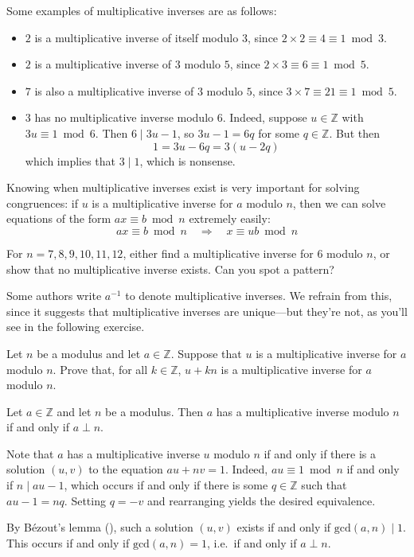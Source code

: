 \begin{example}
Some examples of multiplicative inverses are as follows:
\begin{itemize}
\item $2$ is a multiplicative inverse of itself modulo $3$, since $2 \times 2 \equiv 4 \equiv 1 \bmod 3$.
\item $2$ is a multiplicative inverse of $3$ modulo $5$, since $2 \times 3 \equiv 6 \equiv 1 \bmod 5$.
\item $7$ is also a multiplicative inverse of $3$ modulo $5$, since $3 \times 7 \equiv 21 \equiv 1 \bmod 5$.
\item $3$ has no multiplicative inverse modulo $6$. Indeed, suppose $u \in \mathbb{Z}$ with $3u \equiv 1 \bmod 6$. Then $6 \mid 3u-1$, so $3u-1 = 6q$ for some $q \in \mathbb{Z}$. But then
\[ 1 = 3u-6q = 3(u-2q) \]
which implies that $3 \mid 1$, which is nonsense.
\end{itemize}
\end{example}

Knowing when multiplicative inverses exist is very important for solving congruences: if $u$ is a multiplicative inverse for $a$ modulo $n$, then we can solve equations of the form $ax \equiv b \bmod n$ extremely easily:
\[ ax \equiv b \bmod n \quad \Rightarrow \quad x \equiv ub \bmod n \]

\begin{exercise}
For $n=7,8,9,10,11,12$, either find a multiplicative inverse for $6$ modulo $n$, or show that no multiplicative inverse exists. Can you spot a pattern?
\end{exercise}

Some authors write $a^{-1}$ to denote multiplicative inverses. We refrain from this, since it suggests that multiplicative inverses are unique---but they're not, as you'll see in the following exercise.

\begin{exercise}
Let $n$ be a modulus and let $a \in \mathbb{Z}$. Suppose that $u$ is a multiplicative inverse for $a$ modulo $n$. Prove that, for all $k \in \mathbb{Z}$, $u+kn$ is a multiplicative inverse for $a$ modulo $n$.
\end{exercise}

\begin{proposition} \label{propMultInvExistence}
Let $a \in \mathbb{Z}$ and let $n$ be a modulus. Then $a$ has a multiplicative inverse modulo $n$ if and only if $a \perp n$.
\end{proposition}
\begin{cproof}
Note that $a$ has a multiplicative inverse $u$ modulo $n$ if and only if there is a solution $(u,v)$ to the equation $au+nv=1$. Indeed, $au \equiv 1 \bmod n$ if and only if $n \mid au-1$, which occurs if and only if there is some $q \in \mathbb{Z}$ such that $au-1=nq$. Setting $q=-v$ and rearranging yields the desired equivalence.

By B\'{e}zout's lemma (), such a solution $(u,v)$ exists if and only if $\mathrm{gcd}(a,n) \mid 1$. This occurs if and only if $\mathrm{gcd}(a,n) = 1$, i.e.\ if and only if $a \perp n$.
\end{cproof}

